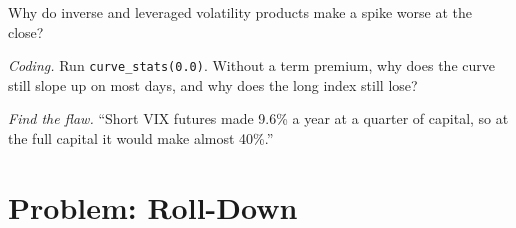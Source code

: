 \begin{exercise}[$\star\star$]\label{exo:s2:the-volatility-index-complex:6}
Why do inverse and leveraged volatility products make a spike worse at the close?
\end{exercise}

\begin{exercise}[$\star\star\star$]\label{exo:s2:the-volatility-index-complex:7}
\emph{Coding.} Run \texttt{curve\_stats(0.0)}. Without a term premium, why does the curve still slope up on most days, and why does the long index
still lose?
\end{exercise}

\begin{exercise}[$\star\star\star$]\label{exo:s2:the-volatility-index-complex:8}
\emph{Find the flaw.} ``Short VIX futures made 9.6\% a year at a quarter of capital, so at the full capital it would make almost 40\%.''
\end{exercise}

\section{Problem: Roll-Down}

